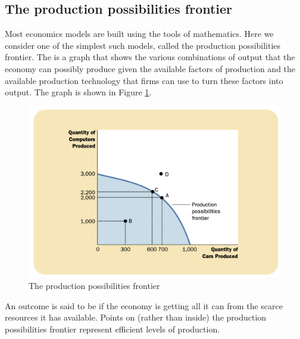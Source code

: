 \subsection{The production possibilities frontier}

Most economics models are built using the tools of mathematics.
Here we consider one of the simplest such models, called the production possibilities frontier.
The  is a graph that shows the various combinations of output that the economy can possibly produce given the available factors of production and the available production technology that firms can use to turn these factors into output. The graph is shown in Figure \ref{fig:the-production-possibilities-frontier}.



\begin{figure}[!ht]
  \centering
  \includegraphics[width=\textwidth]{pics/the-production-possibilities-frontier}
  \caption{The production possibilities frontier}
  \label{fig:the-production-possibilities-frontier}
\end{figure}



An outcome is said to be  if the economy is getting all it can from the scarce resources it has available.
Points on (rather than inside) the production possibilities frontier represent efficient levels of production. 